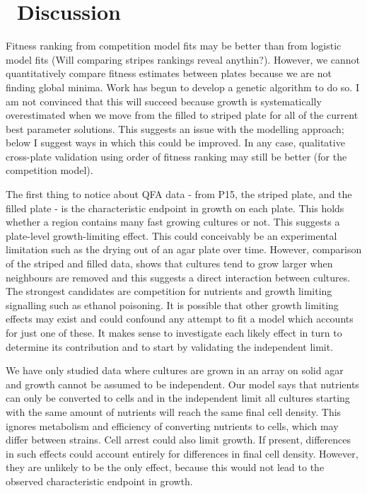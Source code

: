 \graphicspath{{images/}}

\section{\thesection~Discussion}
\label{sec:discussion}

Fitness ranking from competition model fits may be better than from
logistic model fits (Will comparing stripes rankings reveal
anythin?). However, we cannot quantitatively compare fitness estimates
between plates because we are not finding global minima. Work has
begun to develop a genetic algorithm to do so. I am not convinced that
this will succeed because growth is systematically overestimated when
we move from the filled to striped plate for all of the current best
parameter solutions. This suggests an issue with the modelling
approach; below I suggest ways in which this could be improved. In
any case, qualitative cross-plate validation using order of fitness
ranking may still be better (for the competition model).

The first thing to notice about QFA data - from P15, the striped
plate, and the filled plate - is the characteristic endpoint in growth
on each plate. This holds whether a region contains many fast growing
cultures or not. This suggests a plate-level growth-limiting
effect. This could conceivably be an experimental limitation such as
the drying out of an agar plate over time. However, comparison of the
striped and filled data, shows that cultures tend to grow larger when
neighbours are removed and this suggests a direct interaction between
cultures. The strongest candidates are competition for nutrients and
growth limiting signalling such as ethanol poisoning. It is possible
that other growth limiting effects may exist and could confound any
attempt to fit a model which accounts for just one of these. It makes
sense to investigate each likely effect in turn to determine its
contribution and to start by validating the independent limit.

We have only studied data where cultures are grown in an array on
solid agar and growth cannot be assumed to be independent. Our model
says that nutrients can only be converted to cells and in the
independent limit all cultures starting with the same amount of
nutrients will reach the same final cell density. This ignores
metabolism and efficiency of converting nutrients to cells, which may
differ between strains. Cell arrest could also limit growth. If
present, differences in such effects could account entirely for
differences in final cell density. However, they are unlikely to be
the only effect, because this would not lead to the observed
characteristic endpoint in growth.

